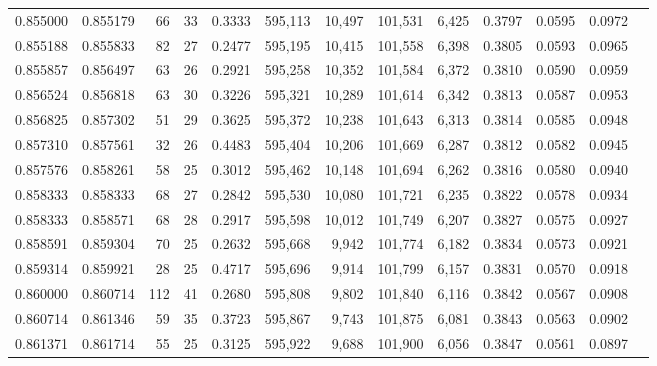 \begin{tabular}{rrrrrrrrrrrrr}
0.855000 & 0.855179 &     66 &    33 &                                     0.3333 & 595,113 &  10,497 & 101,531 &   6,425 & 0.3797 & 0.0595 & 0.0972 \\
0.855188 & 0.855833 &     82 &    27 &                                     0.2477 & 595,195 &  10,415 & 101,558 &   6,398 & 0.3805 & 0.0593 & 0.0965 \\
0.855857 & 0.856497 &     63 &    26 &                                     0.2921 & 595,258 &  10,352 & 101,584 &   6,372 & 0.3810 & 0.0590 & 0.0959 \\
0.856524 & 0.856818 &     63 &    30 &                                     0.3226 & 595,321 &  10,289 & 101,614 &   6,342 & 0.3813 & 0.0587 & 0.0953 \\
0.856825 & 0.857302 &     51 &    29 &                                     0.3625 & 595,372 &  10,238 & 101,643 &   6,313 & 0.3814 & 0.0585 & 0.0948 \\
0.857310 & 0.857561 &     32 &    26 &                                     0.4483 & 595,404 &  10,206 & 101,669 &   6,287 & 0.3812 & 0.0582 & 0.0945 \\
0.857576 & 0.858261 &     58 &    25 &                                     0.3012 & 595,462 &  10,148 & 101,694 &   6,262 & 0.3816 & 0.0580 & 0.0940 \\
0.858333 & 0.858333 &     68 &    27 &                                     0.2842 & 595,530 &  10,080 & 101,721 &   6,235 & 0.3822 & 0.0578 & 0.0934 \\
0.858333 & 0.858571 &     68 &    28 &                                     0.2917 & 595,598 &  10,012 & 101,749 &   6,207 & 0.3827 & 0.0575 & 0.0927 \\
0.858591 & 0.859304 &     70 &    25 &                                     0.2632 & 595,668 &   9,942 & 101,774 &   6,182 & 0.3834 & 0.0573 & 0.0921 \\
0.859314 & 0.859921 &     28 &    25 &                                     0.4717 & 595,696 &   9,914 & 101,799 &   6,157 & 0.3831 & 0.0570 & 0.0918 \\
0.860000 & 0.860714 &    112 &    41 &                                     0.2680 & 595,808 &   9,802 & 101,840 &   6,116 & 0.3842 & 0.0567 & 0.0908 \\
0.860714 & 0.861346 &     59 &    35 &                                     0.3723 & 595,867 &   9,743 & 101,875 &   6,081 & 0.3843 & 0.0563 & 0.0902 \\
0.861371 & 0.861714 &     55 &    25 &                                     0.3125 & 595,922 &   9,688 & 101,900 &   6,056 & 0.3847 & 0.0561 & 0.0897 \\

\end{tabular}
